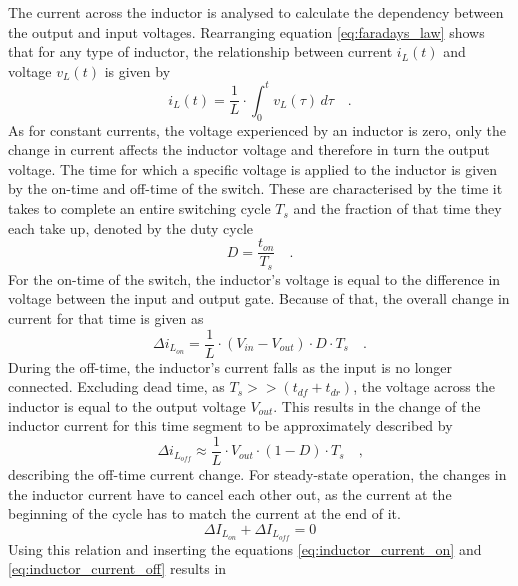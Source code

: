 The current across the inductor is analysed to calculate the dependency between the output and input voltages. Rearranging equation \ref{eq:faradays_law} shows that for any type of inductor, the relationship between current $i_L(t)$ and voltage $v_L(t)$ is given by
\begin{equation}\label{eq:inductor_current}
    i_L(t) = \frac{1}{L} \cdot \int_{0}^{t} v_L(\tau) \,d\tau \quad\text{.}
\end{equation}
As for constant currents, the voltage experienced by an inductor is zero, only the change in current affects the inductor voltage and therefore in turn the output voltage. The time for which a specific voltage is applied to the inductor is given by the on-time and off-time of the switch. These are characterised by the time it takes to complete an entire switching cycle $T_s$ and the fraction of that time they each take up, denoted by the duty cycle
\begin{equation}
    D = \frac{t_{on}}{T_s} \quad\text{.}
\end{equation}
For the on-time of the switch, the inductor's voltage is equal to the difference in voltage between the input and output gate. Because of that, the overall change in current for that time is given as  
\begin{equation}\label{eq:inductor_current_on}
    \Delta i_{L_{on}} = \frac{1}{L} \cdot (V_{in} - V_{out}) \cdot D \cdot T_{s}  \quad\text{.}    
\end{equation} 
During the off-time, the inductor's current falls as the input is no longer connected. Excluding dead time, as $T_s >> (t_{df} + t_{dr})$, the voltage across the inductor is equal to the output voltage $V_{out}$. This results in the change of the inductor current for this time segment to be approximately described by 
\begin{equation}\label{eq:inductor_current_off}
    \Delta i_{L_{off}} \approx \frac{1}{L} \cdot V_{out} \cdot (1-D) \cdot T_{s} \quad\text{,}
\end{equation}
describing the off-time current change.
For steady-state operation, the changes in the inductor current have to cancel each other out, as the current at the beginning of the cycle has to match the current at the end of it. 
\begin{equation}
    \Delta I_{L_{on}} + \Delta I_{L_{off}} = 0                                         
\end{equation}
Using this relation and inserting the equations \ref{eq:inductor_current_on} and \ref{eq:inductor_current_off} results in  
